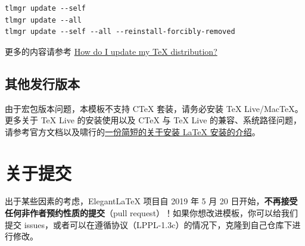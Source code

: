 \documentclass[lang=cn,10pt]{elegantbook}
\begin{document}
\begin{lstlisting}
tlmgr update --self 
tlmgr update --all
tlmgr update --self --all --reinstall-forcibly-removed
\end{lstlisting}

更多的内容请参考 \href{https://tex.stackexchange.com/questions/55437/how-do-i-update-my-tex-distribution}{How do I update my \TeX{} distribution?}

\subsection{其他发行版本}

由于宏包版本问题，本模板不支持 C\TeX{} 套装，请务必安装 TeX Live/Mac\TeX{}。更多关于 \TeX{} Live 的安装使用以及 C\TeX{} 与 \TeX{} Live 的兼容、系统路径问题，请参考官方文档以及啸行的\href{https://github.com/OsbertWang/install-latex-guide-zh-cn/releases/}{一份简短的关于安装 \LaTeX{} 安装的介绍}。


\section{关于提交}

出于某些因素的考虑，Elegant\LaTeX{} 项目自 2019 年 5 月 20 日开始，\textbf{不再接受任何非作者预约性质的提交}（pull request）！如果你想改进模板，你可以给我们提交 issues，或者可以在遵循协议（LPPL-1.3c）的情况下，克隆到自己仓库下进行修改。
\end{document}

